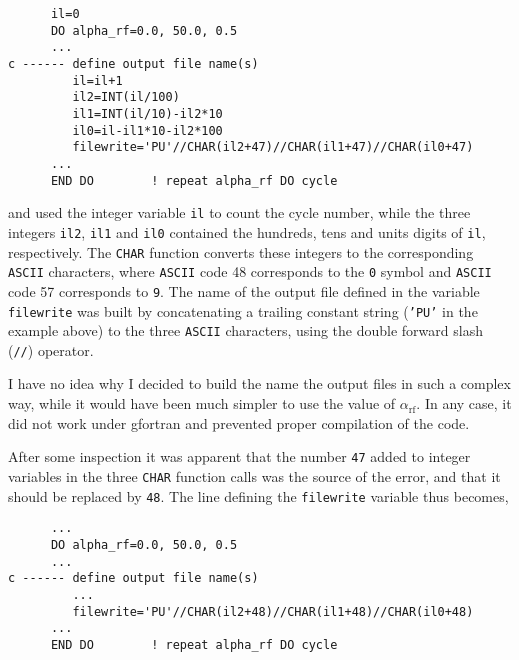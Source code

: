 \begin{lstlisting}
      il=0
      DO alpha_rf=0.0, 50.0, 0.5
      ...
c ------ define output file name(s)
         il=il+1
         il2=INT(il/100)
         il1=INT(il/10)-il2*10
         il0=il-il1*10-il2*100
         filewrite='PU'//CHAR(il2+47)//CHAR(il1+47)//CHAR(il0+47)
      ...
      END DO        ! repeat alpha_rf DO cycle

\end{lstlisting}

and used the integer variable \texttt{il} to count the cycle number, while the three integers \texttt{il2}, \texttt{il1} and \texttt{il0} contained the hundreds, tens and units digits of \texttt{il}, respectively. 
The \texttt{CHAR} function converts these integers to the corresponding \texttt{ASCII} characters, where \texttt{ASCII} code 48 corresponds to the \texttt{0} symbol and \texttt{ASCII} code 57 corresponds to \texttt{9}.
The name of the output file defined in the variable \texttt{filewrite} was built by concatenating a trailing constant string (\texttt{'PU'} in the example above) to the three \texttt{ASCII} characters, using the double forward slash (\texttt{//}) operator.

I have no idea why I decided to build the name the output files in such a complex way, while it would have been much simpler to use the value of $\alpha_\mathrm{rf}$.
In any case, it did not work under gfortran and prevented proper compilation of the code. 

After some inspection it was apparent that the number \texttt{47} added to integer variables in the three \texttt{CHAR} function calls was the source of the error, and that it should be replaced by \texttt{48}. 
The line defining the \texttt{filewrite} variable thus becomes,

\begin{lstlisting}
      ...
      DO alpha_rf=0.0, 50.0, 0.5
      ...
c ------ define output file name(s)
         ...
         filewrite='PU'//CHAR(il2+48)//CHAR(il1+48)//CHAR(il0+48)
      ...
      END DO        ! repeat alpha_rf DO cycle
\end{lstlisting}

